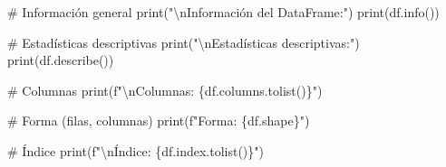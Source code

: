 \documentclass[
  doc,
  floatsintext,
  longtable,
  a4paper,
  nolmodern,
  notxfonts,
  notimes,
  12pt,
  colorlinks=true,linkcolor=blue,citecolor=blue,urlcolor=blue]{apa7}
\newenvironment{Shaded}{\begin{snugshade}}{\end{snugshade}}
\newcommand{\BuiltInTok}[1]{\textcolor[rgb]{0.00,0.23,0.31}{#1}}
\newcommand{\CharTok}[1]{\textcolor[rgb]{0.13,0.47,0.30}{#1}}
\newcommand{\CommentTok}[1]{\textcolor[rgb]{0.37,0.37,0.37}{#1}}
\newcommand{\NormalTok}[1]{\textcolor[rgb]{0.00,0.23,0.31}{#1}}
\newcommand{\SpecialCharTok}[1]{\textcolor[rgb]{0.37,0.37,0.37}{#1}}
\newcommand{\SpecialStringTok}[1]{\textcolor[rgb]{0.13,0.47,0.30}{#1}}
\newcommand{\StringTok}[1]{\textcolor[rgb]{0.13,0.47,0.30}{#1}}
\begin{document}
\begin{Shaded}
\begin{Highlighting}[]
\CommentTok{\# Información general}
\BuiltInTok{print}\NormalTok{(}\StringTok{"}\CharTok{\textbackslash{}n}\StringTok{Información del DataFrame:"}\NormalTok{)}
\BuiltInTok{print}\NormalTok{(df.info())}

\CommentTok{\# Estadísticas descriptivas}
\BuiltInTok{print}\NormalTok{(}\StringTok{"}\CharTok{\textbackslash{}n}\StringTok{Estadísticas descriptivas:"}\NormalTok{)}
\BuiltInTok{print}\NormalTok{(df.describe())}

\CommentTok{\# Columnas}
\BuiltInTok{print}\NormalTok{(}\SpecialStringTok{f"}\CharTok{\textbackslash{}n}\SpecialStringTok{Columnas: }\SpecialCharTok{\{}\NormalTok{df}\SpecialCharTok{.}\NormalTok{columns}\SpecialCharTok{.}\NormalTok{tolist()}\SpecialCharTok{\}}\SpecialStringTok{"}\NormalTok{)}

\CommentTok{\# Forma (filas, columnas)}
\BuiltInTok{print}\NormalTok{(}\SpecialStringTok{f"Forma: }\SpecialCharTok{\{}\NormalTok{df}\SpecialCharTok{.}\NormalTok{shape}\SpecialCharTok{\}}\SpecialStringTok{"}\NormalTok{)}

\CommentTok{\# Índice}
\BuiltInTok{print}\NormalTok{(}\SpecialStringTok{f"}\CharTok{\textbackslash{}n}\SpecialStringTok{Índice: }\SpecialCharTok{\{}\NormalTok{df}\SpecialCharTok{.}\NormalTok{index}\SpecialCharTok{.}\NormalTok{tolist()}\SpecialCharTok{\}}\SpecialStringTok{"}\NormalTok{)}
\end{Highlighting}
\end{Shaded}
\end{document}

